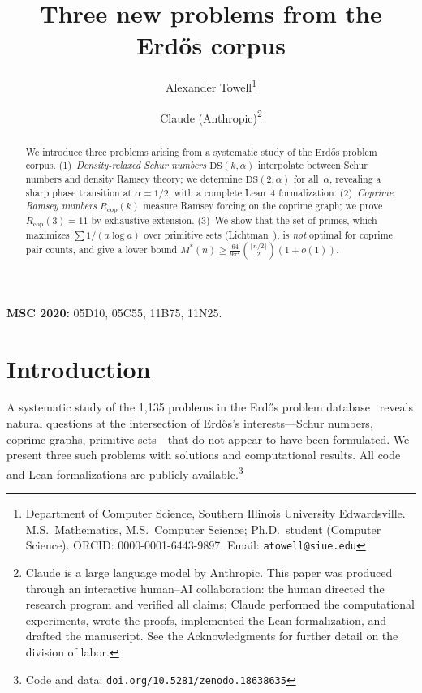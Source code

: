 \documentclass[11pt]{article}
\theoremstyle{plain}
\theoremstyle{definition}
\newcommand{\DS}{\mathrm{DS}}
\newcommand{\Rcop}{R_{\mathrm{cop}}}
\begin{document}
\title{Three new problems from the Erd\H{o}s corpus}

\author{Alexander Towell\thanks{Department of Computer Science,
Southern Illinois University Edwardsville.
M.S.\ Mathematics, M.S.\ Computer Science; Ph.D.\ student (Computer Science).
ORCID: 0000-0001-6443-9897. Email: \texttt{atowell@siue.edu}}
\and Claude (Anthropic)\thanks{Claude is a large
language model by Anthropic. This paper was produced through an
interactive human--AI collaboration: the human directed the research
program and verified all claims; Claude performed the computational
experiments, wrote the proofs, implemented the Lean formalization,
and drafted the manuscript. See the Acknowledgments for further
detail on the division of labor.}}

\date{}
\maketitle

\begin{abstract}
We introduce three problems arising from a systematic study of the
Erd\H{o}s problem corpus. (1)~\emph{Density-relaxed Schur numbers}
$\DS(k,\alpha)$ interpolate between Schur numbers and density Ramsey
theory; we determine $\DS(2,\alpha)$ for all~$\alpha$, revealing a
sharp phase transition at $\alpha=1/2$, with a complete Lean~4
formalization.
(2)~\emph{Coprime Ramsey numbers} $\Rcop(k)$ measure Ramsey forcing
on the coprime graph; we prove $\Rcop(3)=11$ by exhaustive extension.
(3)~We show that the set of primes, which maximizes $\sum 1/(a\log a)$
over primitive sets (Lichtman~\cite{lichtman2023}), is \emph{not}
optimal for coprime pair counts, and give a lower bound
$M^*(n)\ge\frac{64}{9\pi^2}\binom{\lceil n/2\rceil}{2}(1+o(1))$.
\end{abstract}

\smallskip\noindent\textbf{MSC 2020:} 05D10, 05C55, 11B75, 11N25.

\section{Introduction}\label{sec:intro}

A systematic study of the 1{,}135 problems in the Erd\H{o}s problem
database~\cite{tao2025erdos} reveals natural questions at the
intersection of Erd\H{o}s's interests---Schur numbers, coprime graphs,
primitive sets---that do not appear to have been formulated. We present
three such problems with solutions and computational results. All code
and Lean formalizations are publicly available.\footnote{Code and data:
\texttt{doi.org/10.5281/zenodo.18638635}}
\end{document}
